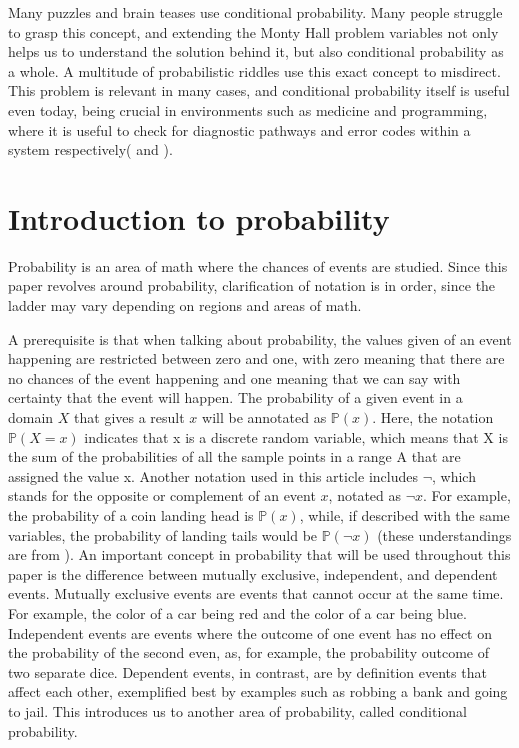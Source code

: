 \documentclass{article}
\begin{document}
\par
Many puzzles and brain teases use conditional probability. Many people struggle to grasp this concept, and extending the Monty Hall problem variables not only helps us to understand the solution behind it, but also conditional probability as a whole. A multitude of probabilistic riddles use this exact concept to misdirect. This problem is relevant in many cases, and conditional probability itself is useful even today, being crucial in environments such as medicine and programming, where it is useful to check for diagnostic pathways and error codes within a system respectively(\cite{ackerman2019computability} and \cite{temple2021conditional}).

\section*{Introduction to probability}
Probability is an area of math where the chances of events are studied. Since this paper revolves around probability, clarification of notation is in order, since the ladder may vary depending on regions and areas of math.
\par
A prerequisite is that when talking about probability, the values given of an event happening are restricted between zero and one, with zero meaning that there are no chances of the event happening and one meaning that we can say with certainty that the event will happen. The probability of a given event in a domain $X$ that gives a result $x$ will be annotated as $\mathbb{P}(x)$. Here, the notation $\mathbb{P}(X=x)$ indicates that x is a discrete random variable, which means that X is the sum of the probabilities of all the sample points in a range A that are assigned the value x. Another notation used in this article includes $\neg$, which stands for the opposite or complement of an event $x$, notated as $\neg x$. For example, the probability of a coin landing head is $\mathbb{P}(x)$, while, if described with the same variables, the probability of landing tails would be $\mathbb{P}(\neg x)$ (these understandings are from \cite{jaynes2003probability}).
An important concept in probability that will be used throughout this paper is the difference between mutually exclusive, independent, and dependent events. Mutually exclusive events are events that cannot occur at the same time. For example, the color of a car being red and the color of a car being blue. Independent events are events where the outcome of one event has no effect on the probability of the second even, as, for example, the probability outcome of two separate dice. Dependent events, in contrast, are by definition events that affect each other, exemplified best by examples such as robbing a bank and going to jail. This introduces us to another area of probability, called conditional probability.
\end{document}

